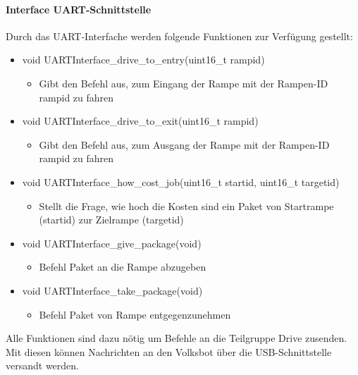 \paragraph{Interface UART-Schnittstelle}
Durch das UART-Interfache werden folgende Funktionen zur Verfügung gestellt:
\begin{itemize}
  \item void UARTInterface\_drive\_to\_entry(uint16\_t rampid)
  \begin{itemize}
    \item Gibt den Befehl aus, zum Eingang der Rampe mit der Rampen-ID rampid zu fahren
  \end{itemize}
  \item void UARTInterface\_drive\_to\_exit(uint16\_t rampid)
  \begin{itemize}
    \item Gibt den Befehl aus, zum Ausgang der Rampe mit der Rampen-ID rampid zu fahren
  \end{itemize}
  \item void UARTInterface\_how\_cost\_job(uint16\_t startid, uint16\_t targetid)
  \begin{itemize}
    \item Stellt die Frage, wie hoch die Kosten sind ein Paket von Startrampe (startid) zur Zielrampe (targetid)
  \end{itemize}
  \item void UARTInterface\_give\_package(void)
  \begin{itemize}
    \item Befehl Paket an die Rampe abzugeben
  \end{itemize}
  \item void UARTInterface\_take\_package(void)
  \begin{itemize}
    \item Befehl Paket von Rampe entgegenzunehmen
  \end{itemize}
\end{itemize}
Alle Funktionen sind dazu nötig um Befehle an die Teilgruppe Drive zusenden. Mit diesen können Nachrichten an den Volksbot über die USB-Schnittstelle versandt werden.
